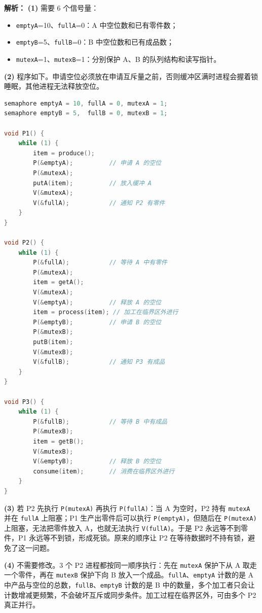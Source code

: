 \begin{enumerate}[resume]
\ifshowsolutions\par\noindent\textbf{解析：}
\textbf{(1)} 需要 6 个信号量：
\begin{itemize}
\item \texttt{emptyA}=10、\texttt{fullA}=0：A 中空位数和已有零件数；
\item \texttt{emptyB}=5、\texttt{fullB}=0：B 中空位数和已有成品数；
\item \texttt{mutexA}=1、\texttt{mutexB}=1：分别保护 A、B 的队列结构和读写指针。
\end{itemize}

\textbf{(2)} 程序如下。申请空位必须放在申请互斥量之前，否则缓冲区满时进程会握着锁睡眠，其他进程无法释放空位。
\begin{lstlisting}[language=C]
semaphore emptyA = 10, fullA = 0, mutexA = 1;
semaphore emptyB = 5,  fullB = 0, mutexB = 1;

void P1() {
    while (1) {
        item = produce();
        P(&emptyA);          // 申请 A 的空位
        P(&mutexA);
        putA(item);          // 放入缓冲 A
        V(&mutexA);
        V(&fullA);           // 通知 P2 有零件
    }
}

void P2() {
    while (1) {
        P(&fullA);           // 等待 A 中有零件
        P(&mutexA);
        item = getA();
        V(&mutexA);
        V(&emptyA);          // 释放 A 的空位
        item = process(item); // 加工在临界区外进行
        P(&emptyB);          // 申请 B 的空位
        P(&mutexB);
        putB(item);
        V(&mutexB);
        V(&fullB);           // 通知 P3 有成品
    }
}

void P3() {
    while (1) {
        P(&fullB);           // 等待 B 中有成品
        P(&mutexB);
        item = getB();
        V(&mutexB);
        V(&emptyB);          // 释放 B 的空位
        consume(item);       // 消费在临界区外进行
    }
}
\end{lstlisting}

\textbf{(3)} 若 P2 先执行 \texttt{P(mutexA)} 再执行 \texttt{P(fullA)}：当 A 为空时，P2 持有 \texttt{mutexA} 并在 \texttt{fullA} 上阻塞；P1 生产出零件后可以执行 \texttt{P(emptyA)}，但随后在 \texttt{P(mutexA)} 上阻塞，无法把零件放入 A，也就无法执行 \texttt{V(fullA)}。于是 P2 永远等不到零件，P1 永远等不到锁，形成死锁。原来的顺序让 P2 在等待数据时不持有锁，避免了这一问题。

\textbf{(4)} 不需要修改。3 个 P2 进程都按同一顺序执行：先在 \texttt{mutexA} 保护下从 A 取走一个零件，再在 \texttt{mutexB} 保护下向 B 放入一个成品。\texttt{fullA}、\texttt{emptyA} 计数的是 A 中产品与空位的总数，\texttt{fullB}、\texttt{emptyB} 计数的是 B 中的数量，多个加工者只会让计数增减更频繁，不会破坏互斥或同步条件。加工过程在临界区外，可由多个 P2 真正并行。


\end{enumerate}
